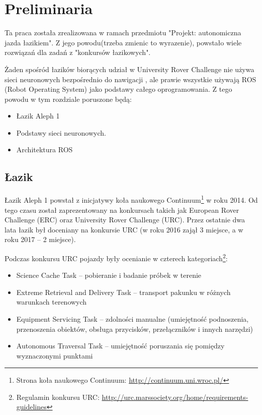 \chapter{Preliminaria}
Ta praca została zrealizowana w ramach przedmiotu "Projekt: autonomiczna jazda łazikiem".
Z jego powodu(trzeba zmienic to wyrazenie), powstało wiele rozwiązań dla zadań z 
"konkursów łazikowych".

Żaden spośród łazików biorących udział w University Rover Challenge nie 
używa sieci neuronowych bezpośrednio do nawigacji , ale prawie wszystkie używają
ROS (Robot Operating System) jako podstawy całego oprogramowania. Z tego powodu
w tym rozdziale poruszone będą:
\begin{itemize}
  \item Łazik Aleph 1
  \item Podstawy sieci neuronowych.
  \item Architektura ROS
\end{itemize}
\section {Łazik}
Łazik Aleph 1 powstał z inicjatywy koła naukowego Continuum\footnote{ Strona koła naukowego Continuum:
\href{http://continuum.uni.wroc.pl/}{http://continuum.uni.wroc.pl/}}
w roku 2014. Od tego czasu został zaprezentowany na konkursach takich jak 
European Rover Challenge (ERC) oraz University Rover Challenge (URC). Przez ostatnie
dwa lata łazik był doceniany na konkursie URC (w roku 2016 zajął 3 miejsce, a w roku
2017 -- 2 miejsce).

Podczas konkursu URC pojazdy były ocenianie w czterech kategoriach\footnote{
Regulamin konkursu URC: \href{http://urc.marssociety.org/home/requirements-guidelines}
{http://urc.marssociety.org/home/requirements-guidelines}}:
\begin{itemize}
  \item Science Cache Task -- pobieranie i badanie próbek w terenie 
  \item Extreme Retrieval and Delivery Task -- transport pakunku w różnych warunkach
    terenowych
  \item Equipment Servicing Task -- zdolności manualne (umiejętność podnoszenia,
    przenoszenia obiektów, obsługa przycisków, przełączników i innych narzędzi)
  \item Autonomous Traversal Task -- umiejętność poruszania się pomiędzy wyznaczonymi
    punktami
\end{itemize}


